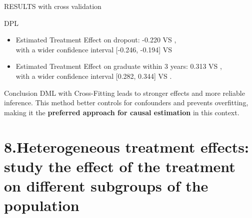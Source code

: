 \documentclass[aspectratio=169]{beamer}
\begin{document}
\begin{frame}{RESULTS with cross validation}

\vspace{20pt}
\begin{alertblock}{DPL}
	\begin{itemize}[label=--,itemsep=1pt,topsep=2pt]
	\item Estimated Treatment Effect on dropout: -0.220 VS ,\\ with a wider confidence interval [-0.246, -0.194] VS   
	\item Estimated Treatment Effect on graduate within 3 years:  0.313 VS ,\\ 
    with a wider confidence interval [0.282, 0.344] VS .

\end{itemize}
\end{alertblock}


\begin{exampleblock}{Conclusion}
\vspace{-2pt}
DML with Cross-Fitting  leads to stronger effects and more reliable inference. This method better controls for confounders and prevents overfitting, making it the \textbf{preferred approach for causal estimation} in this context.

\vspace{-3pt}
	
\end{exampleblock}

    
\end{frame}






\section{8.Heterogeneous treatment effects: study the effect of the treatment on different subgroups of the population}
\end{document}
